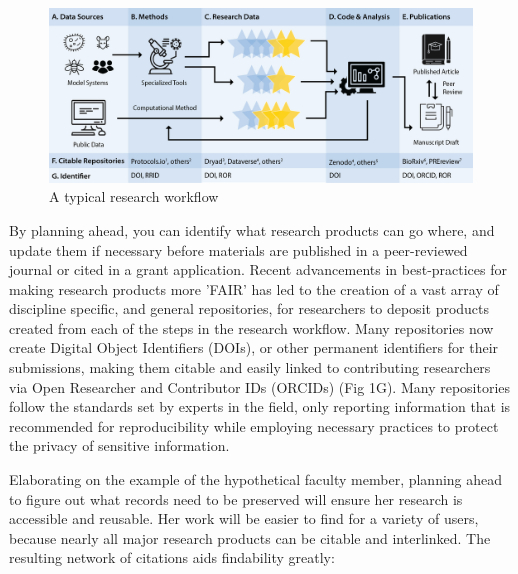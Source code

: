 \documentclass[10pt,letterpaper]{article}
\begin{document}
\begin{figure}
  \includegraphics[width=\textwidth]{workflow.png}
  \captionsetup{justification=centering}
  \caption{A typical research workflow}
  \label{workflow}
\end{figure}

By planning ahead, you can identify what research products can go where, and
update them if necessary before materials are published in a peer-reviewed
journal or cited in a grant application. Recent advancements in best-practices
for making research products more 'FAIR' has led to the creation of a vast array
of discipline specific, and general repositories\cite{PLOS2020}, for researchers
to deposit products created from each of the steps in the research workflow.
Many repositories now create Digital Object Identifiers (DOIs)\cite{DOI2020}, or
other permanent identifiers for their submissions, making them citable and
easily linked to contributing researchers via Open Researcher and Contributor
IDs (ORCIDs)\cite{ORCID2020} (Fig 1G). Many repositories follow the standards
set by experts in the field, only reporting information that is recommended for
reproducibility while employing necessary practices to protect the privacy of
sensitive information.

Elaborating on the example of the hypothetical faculty member, planning ahead to
figure out what records need to be preserved will ensure her research is
accessible and reusable. Her work will be easier to find for a variety of
users, because nearly all major research products can be citable and
interlinked. The resulting network of citations aids findability greatly:
\end{document}
